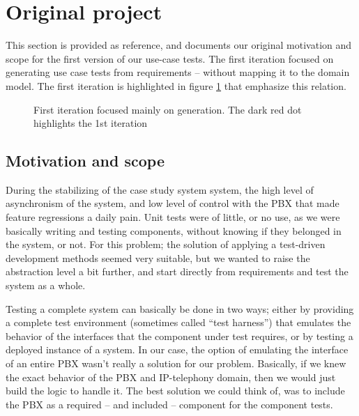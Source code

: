 \section{Original project}
This section is provided as reference, and documents our original motivation and scope for the first version of our use-case tests. The first iteration focused on generating use case tests from requirements -- without mapping it to the domain model. The first iteration is highlighted in figure \ref{fig:project_parameter_plot_1st_iteration} that emphasize this relation. \medskip
\begin{figure}[!htbp]
\centering
{}
\caption{First iteration focused mainly on generation. The dark red dot highlights the 1st iteration}
\label{fig:project_parameter_plot_1st_iteration}
\end{figure}

\subsection{Motivation and scope}
During the stabilizing of the case study system system, the high level of asynchronism of the system, and low level of control with the PBX that made feature regressions a daily pain. Unit tests were of little, or no use, as we were basically writing and testing components, without knowing if they belonged in the system, or not. For this problem; the solution of applying a test-driven development methods seemed very suitable, but we wanted to raise the abstraction level a bit further, and start directly from requirements and test the system as a whole.\medskip

\noindent Testing a complete system can basically be done in two ways; either by providing a complete test environment (sometimes called ``test harness'') that emulates the behavior of the interfaces that the component under test requires, or by testing a deployed instance of a system. In our case, the option of emulating the interface of an entire PBX wasn't really a solution for our problem. Basically, if we knew the exact behavior of the PBX and IP-telephony domain, then we would just build the logic to handle it. The best solution we could think of, was to include the PBX as a required -- and included -- component for the component tests.\medskip

